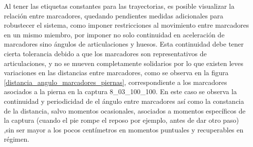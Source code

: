 Al tener las etiquetas constantes para las trayectorias, es posible visualizar la relación entre marcadores, quedando pendientes medidas adicionales para robustecer el sistema, como imponer restricciones al movimiento entre marcadores en un mismo miembro, por imponer no solo continuidad en aceleración de marcadores sino ángulos de articulaciones y huesos. Esta continuidad debe tener cierta tolerancia debido a que los marcadores son representativos de articulaciones, y no se mueven completamente solidarios por lo que existen leves variaciones en las distancias entre marcadores, como se observa en la figura \ref{distancia_angulo_marcadores_piernas}, correspondiente a los marcadores asociados a la pierna en la captura 8\_03\_100\_100. En este caso se observa la continuidad y periodicidad de el ángulo entre marcadores así como la constancia de la distancia, salvo momentos ocasionales, asociados a momentos específicos de la captura (cuando el pie rompe el reposo por ejemplo, antes de dar otro paso) ,sin ser mayor a los pocos centímetros en momentos puntuales y recuperables en régimen.

